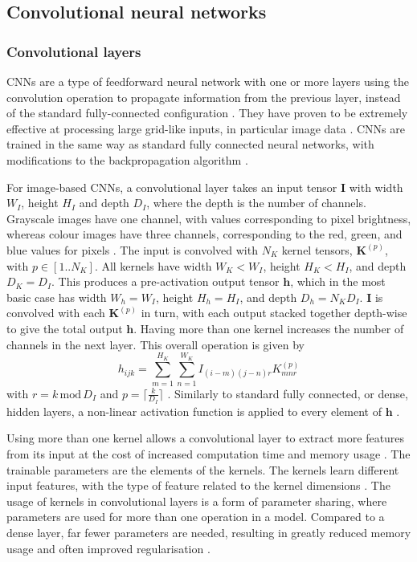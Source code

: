 \documentclass[12pt]{article}
\begin{document}
\subsection{Convolutional neural networks}
\subsubsection{Convolutional layers}
CNNs are a type of feedforward neural network with one or more layers using the convolution operation to propagate information from the previous layer, instead of the standard fully-connected configuration \cite{Goodfellow16}. They have proven to be extremely effective at processing large grid-like inputs, in particular image data \cite{Shrestha19}. CNNs are trained in the same way as standard fully connected neural networks, with modifications to the backpropagation algorithm \cite{Bengio93}.

For image-based CNNs, a convolutional layer takes an input tensor $\bm{I}$ with width $W_I$, height $H_I$ and depth $D_I$, where the depth is the number of channels. Grayscale images have one channel, with values corresponding to pixel brightness, whereas colour images have three channels, corresponding to the red, green, and blue values for pixels \cite{Aghdam17, Goodfellow16}. The input is convolved with $N_K$ kernel tensors, $\bm{K}^{(p)}$, with $p\in[1..N_K]$. All kernels have width $W_K<W_I$, height $H_K<H_I$, and depth $D_K=D_I$. This produces a pre-activation output tensor $\bm{\bm{h}}$, which in the most basic case has width $W_h=W_I$, height $H_h=H_I$, and depth $D_h=N_KD_I$. $\bm{I}$ is convolved with each $\bm{K}^{(p)}$ in turn, with each output stacked together depth-wise to give the total output $\bm{h}$. Having more than one kernel increases the number of channels in the next layer. This overall operation is given by
\begin{equation}
\label{ConvLayer}
h_{ijk}=\sum_{m=1}^{H_K}\sum_{n=1}^{W_K}I_{(i-m)(j-n)r}K_{mnr}^{(p)}
\end{equation}
with $r=k\,\mathrm{mod}\,D_I$ and $p=\lceil\frac{k}{D_I}\rceil$ \cite{Aghdam17, Goodfellow16}. Similarly to standard fully connected, or dense, hidden layers, a non-linear activation function is applied to every element of $\bm{h}$ \cite{Aghdam17, Goodfellow16}. 

Using more than one kernel allows a convolutional layer to extract more features from its input at the cost of increased computation time and memory usage \cite{Goodfellow16}. The trainable parameters are the elements of the kernels. The kernels learn different input features, with the type of feature related to the kernel dimensions \cite{Aghdam17, Goodfellow16}. The usage of kernels in convolutional layers is a form of parameter sharing, where parameters are used for more than one operation in a model. Compared to a dense layer, far fewer parameters are needed, resulting in greatly reduced memory usage and often improved regularisation \cite{Aghdam17, Goodfellow16}. 
\end{document}
